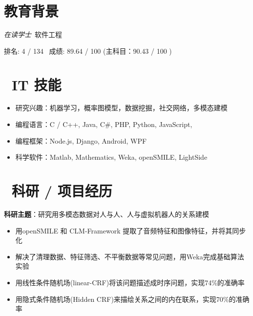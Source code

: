 \documentclass{resume}
\begin{document}



\section{\faGraduationCap 教育背景}
\textit{在读学士}\ 软件工程

排名: 4 / 134 \ 成绩: 89.64 / 100 (主科目：90.43 / 100 )


\section{\faCogs\ IT 技能}
\begin{itemize}[parsep=0.5ex]
  \item 研究兴趣：机器学习，概率图模型，数据挖掘，社交网络，多模态建模
  \item 编程语言：C / C++, Java, C\#, PHP, Python, JavaScript,
  \item 编程框架：Node.js, Django, Android, WPF
  \item 科学软件：Matlab, Mathematics, Weka, openSMILE, LightSide
\end{itemize}


\section{\faUsers\ 科研 / 项目经历}
\textbf{科研主题}：研究用多模态数据对人与人、人与虚拟机器人的关系建模
\begin{itemize}
\item 用openSMILE 和 CLM-Framework 提取了音频特征和图像特征，并将其同步化
\item 解决了清理数据、特征筛选、不平衡数据等常见问题，用Weka完成基础算法实验
\item 用线性条件随机场(linear-CRF)将该问题描述成时序问题，实现74\%的准确率
\item 用隐式条件随机场(Hidden CRF)来描绘关系之间的内在联系，实现70\%的准确率
\end{itemize}
\end{document}
